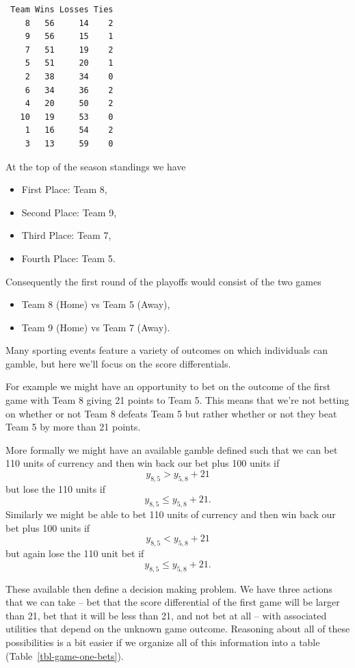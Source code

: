 \documentclass[
  letterpaper,
  DIV=11,
  numbers=noendperiod]{scrartcl}
\providecommand{\tightlist}{%
  \setlength{\itemsep}{0pt}\setlength{\parskip}{0pt}}\usepackage{longtable,booktabs,array}
\begin{document}
\begin{verbatim}
 Team Wins Losses Ties
    8   56     14    2
    9   56     15    1
    7   51     19    2
    5   51     20    1
    2   38     34    0
    6   34     36    2
    4   20     50    2
   10   19     53    0
    1   16     54    2
    3   13     59    0
\end{verbatim}

At the top of the season standings we have

\begin{itemize}
\tightlist
\item
  First Place: Team 8,
\item
  Second Place: Team 9,
\item
  Third Place: Team 7,
\item
  Fourth Place: Team 5.
\end{itemize}

Consequently the first round of the playoffs would consist of the two
games

\begin{itemize}
\tightlist
\item
  Team 8 (Home) vs Team 5 (Away),
\item
  Team 9 (Home) vs Team 7 (Away).
\end{itemize}

Many sporting events feature a variety of outcomes on which individuals
can gamble, but here we'll focus on the score differentials.

For example we might have an opportunity to bet on the outcome of the
first game with Team 8 giving 21 points to Team 5. This means that we're
not betting on whether or not Team 8 defeats Team 5 but rather whether
or not they beat Team 5 by more than 21 points.

More formally we might have an available gamble defined such that we can
bet 110 units of currency and then win back our bet plus 100 units if \[
y_{8,5} > y_{5,8} + 21
\] but lose the 110 units if \[
y_{8,5} \le y_{5,8} + 21.
\] Similarly we might be able to bet 110 units of currency and then win
back our bet plus 100 units if \[
y_{8,5} < y_{5,8} + 21
\] but again lose the 110 unit bet if \[
y_{8,5} \le y_{5,8} + 21.
\]

These available then define a decision making problem. We have three
actions that we can take -- bet that the score differential of the first
game will be larger than 21, bet that it will be less than 21, and not
bet at all -- with associated utilities that depend on the unknown game
outcome. Reasoning about all of these possibilities is a bit easier if
we organize all of this information into a table
(Table~\ref{tbl-game-one-bets}).
\end{document}
